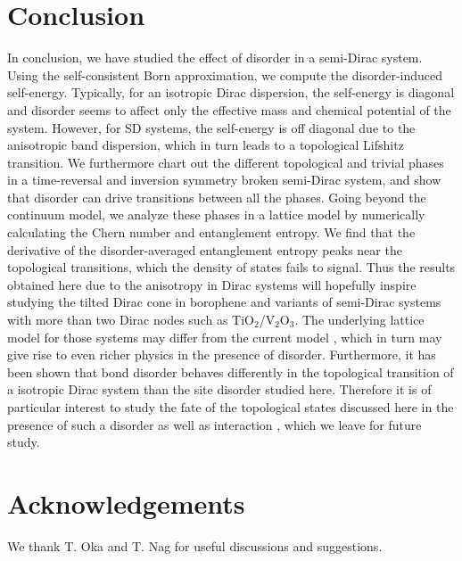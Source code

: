\documentclass[aps,prb,showpacs,twocolumn,floats]{revtex4-1}
\begin{document}
\section {Conclusion}
In conclusion, we have studied the effect of disorder in a semi-Dirac system. Using the self-consistent Born approximation, we compute the disorder-induced self-energy. Typically, for an isotropic  Dirac dispersion, the self-energy is diagonal and disorder seems to affect only the effective mass and chemical potential of the system. However, for SD systems, the self-energy is off diagonal due to the anisotropic band dispersion, which in turn leads to a topological Lifshitz transition. We furthermore chart out the different topological and trivial phases in a time-reversal and inversion symmetry broken semi-Dirac system, and show that disorder can drive transitions between all the phases. Going beyond the continuum model, we analyze these phases in a lattice model by numerically calculating the Chern number and entanglement entropy. We find that the derivative of the disorder-averaged entanglement entropy peaks near the topological transitions, which the density of states fails to signal. Thus the results obtained here due to the anisotropy in Dirac systems will hopefully inspire studying the tilted Dirac cone in borophene and variants of semi-Dirac systems with more than two Dirac nodes such as TiO$_2$/V$_2$O$_3$. The underlying lattice model for those systems may differ from the current model \cite{banerjee}, which in turn may give rise to even richer physics in the presence of disorder.  Furthermore, it has been shown \cite{song} that bond disorder behaves differently in the topological transition of a isotropic Dirac system than the site disorder studied here. Therefore it is of particular interest to study the fate of the topological states discussed here in the presence of such a disorder as well as interaction \cite{fiete2}, which we leave for future study. 
   
\section{Acknowledgements}
We thank T. Oka and T. Nag for useful discussions and suggestions.
\end{document}
